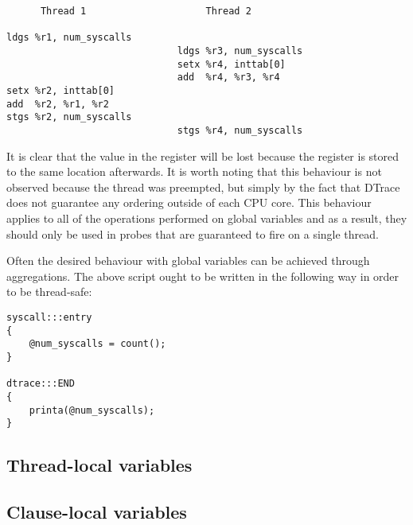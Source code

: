 \begin{verbatim}
      Thread 1                     Thread 2

ldgs %r1, num_syscalls
                              ldgs %r3, num_syscalls
                              setx %r4, inttab[0]
                              add  %r4, %r3, %r4
setx %r2, inttab[0]
add  %r2, %r1, %r2
stgs %r2, num_syscalls
                              stgs %r4, num_syscalls
\end{verbatim}

\noindent
It is clear that the value in the  register will be lost because the register
 is stored to the same location afterwards. It is worth noting that this
behaviour is not observed because the thread was preempted, but simply by the fact that DTrace
does not guarantee any ordering outside of each CPU core. This behaviour applies to all of the
operations performed on global variables and as a result, they should only be used in probes that
are guaranteed to fire on a single thread.

\noindent
Often the desired behaviour with global variables can be achieved through aggregations. The above
script ought to be written in the following way in order to be thread-safe:

\begin{verbatim}
syscall:::entry
{
    @num_syscalls = count();
}

dtrace:::END
{
    printa(@num_syscalls);
}
\end{verbatim}

\subsection{Thread-local variables}

\subsection{Clause-local variables}